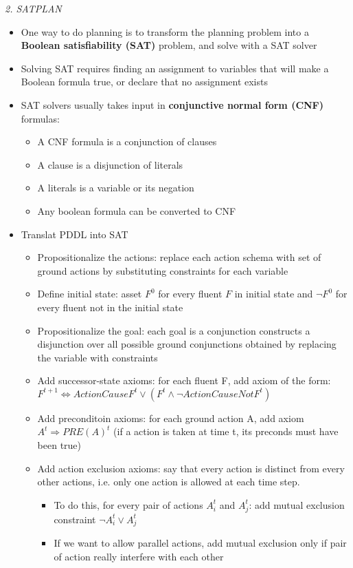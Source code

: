 \documentclass[12pt]{article}
\begin{document}
\noindent
\textsl{2. SATPLAN}
\begin{itemize}
\item One way to do planning is to transform the planning problem into a \textbf{Boolean satisfiability (SAT)} problem, and solve with a SAT solver
\item Solving SAT requires finding an assignment to variables that will make a Boolean formula true, or declare that no assignment exists
\item SAT solvers usually takes input in \textbf{conjunctive normal form (CNF)} formulas:
\begin{itemize}
\item A CNF formula is a conjunction of clauses
\item A clause is a disjunction of literals 
\item A literals is a variable or its negation
\item Any boolean formula can be converted to CNF
\end{itemize}
\item Translat PDDL into SAT
\begin{itemize}
\item Propositionalize the actions: replace each action schema with set of ground actions by substituting constraints for each variable
\item Define initial state: asset $F^0$ for every fluent $F$ in initial state and $\neg F^0$ for every fluent not in the initial state
\item Propositionalize the goal: each goal is a conjunction constructs a disjunction over all possible ground conjunctions obtained by replacing the variable with constraints
\item Add successor-state axioms: for each fluent F, add axiom of the form:\\

$F^{t+1} \Leftrightarrow ActionCauseF^t \lor (F^t \land \neg ActionCauseNotF^t)$

\item Add preconditoin axioms: for each ground action A, add axiom $A^t \Rightarrow PRE(A)^t$ (if a action is taken at time t, its preconds must have been true)
\item Add action exclusion axioms: say that every action is distinct from every other actions, i.e. only one action is allowed at each time step. 
\begin{itemize}
\item To do this, for every pair of actions $A_i^t$ and $A_j^t$: add mutual exclusion constraint $\neg A_i^t \lor A_j^t$
\item If we want to allow parallel actions, add mutual exclusion only if pair of action really interfere with each other
\end{itemize}
\end{itemize}
\end{itemize}
\end{document}
